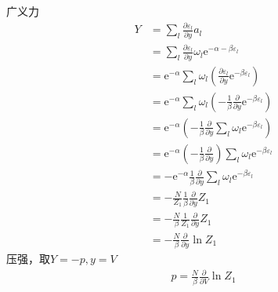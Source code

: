 广义力
\begin{equation}
    \begin{aligned}
        Y&=\sum_l{\frac{\partial \varepsilon _l}{\partial y}a_l}
\\
&=\sum_l{\frac{\partial \varepsilon _l}{\partial y}\omega _l\mathrm{e}^{-\alpha -\beta \varepsilon _l}}
\\
&=\mathrm{e}^{-\alpha}\sum_l{\omega _l\left( \frac{\partial \varepsilon _l}{\partial y}\mathrm{e}^{-\beta \varepsilon _l} \right)}
\\
&=\mathrm{e}^{-\alpha}\sum_l{\omega _l\left( -\frac{1}{\beta}\frac{\partial}{\partial y}\mathrm{e}^{-\beta \varepsilon _l} \right)}
\\
&=\mathrm{e}^{-\alpha}\left( -\frac{1}{\beta}\frac{\partial}{\partial y}\sum_l{\omega _l\mathrm{e}^{-\beta \varepsilon _l}} \right) 
\\
&=\mathrm{e}^{-\alpha}\left( -\frac{1}{\beta}\frac{\partial}{\partial y} \right) \sum_l{\omega _l\mathrm{e}^{-\beta \varepsilon _l}}
\\
&=-\mathrm{e}^{-\alpha}\frac{1}{\beta}\frac{\partial}{\partial y}\sum_l{\omega _l\mathrm{e}^{-\beta \varepsilon _l}}
\\
&=-\frac{N}{Z_1}\frac{1}{\beta}\frac{\partial}{\partial y}Z_1
\\
&=-\frac{N}{\beta}\frac{1}{Z_1}\frac{\partial}{\partial y}Z_1
\\
&=-\frac{N}{\beta}\frac{\partial}{\partial y}\ln Z_1
    \end{aligned}
\end{equation}
压强，取$Y=-p,y=V$
\begin{equation}
    \begin{aligned}
        p=\frac{N}{\beta}\frac{\partial}{\partial V}\ln Z_1
    \end{aligned}
\end{equation}


\begin{equation}
    \begin{aligned}
        
    \end{aligned}
\end{equation}


\begin{equation}
    \begin{aligned}
        
    \end{aligned}
\end{equation}

